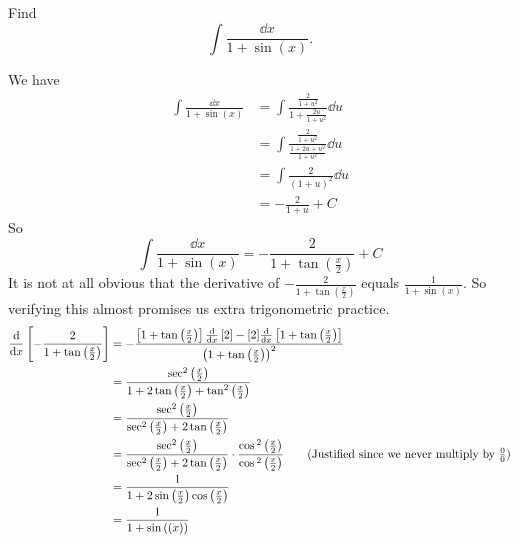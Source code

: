\begin{exercise}
    Find 
    \[ \int \frac{\dd{x}}{1 + \sin{ \left( x \right) }} .\]
\end{exercise}
\begin{solution}
We have 
\begin{align*}
    \int \frac{\dd{x}}{1 + \sin{ \left( x \right) }} &= \int \frac{ \frac{2}{1+ u^{2}}}{1 + \frac{2u}{1+u^{2}}} \dd{u} \\
    &= \int \frac{ \frac{2}{1+u^{2}}}{ \frac{1 + 2u + u^{2}}{1 + u^{2}}} \dd{u} \\
    &= \int \frac{2}{ \left( 1+u  \right)^{2}} \dd{u} \\
    &= - \frac{2}{1+u} + C
\end{align*}
So  \[ \boxed{\int \frac{\dd{x}}{1 + \sin{ \left( x \right) }}  = - \frac{2}{1 + \tan{ \left( \frac{x}{2} \right) }} +C} \]
It is not at all obvious that the derivative of \( - \frac{2}{1 + \tan{ \left( \frac{x}{2} \right) }} \) equals \( \frac{1}{1 + \sin{ \left( x \right) }} \). So verifying this almost promises us extra trigonometric practice. 
\begin{align*}
    \dv{x} \left[  - \frac{2}{1 + \tan{ \left( \frac{x}{2} \right) }}  \right] &= - \frac{  \left[ 1 + \tan{ \left( \frac{x}{2} \right) } \right] \dv{x}\left[ 2 \right] - [2] \dv{x} \left[ 1 + \tan{ \left( \frac{x}{2} \right) } \right]  }{ \left( 1 + \tan{ \left( \frac{x}{2} \right) } \right)^{2}} \\ 
    &= \frac{ \sec^{2}{ \left( \frac{x}{2} \right) }}{1 + 2 \tan{ \left( \frac{x}{2} \right) } + \tan^{2}{ \left( \frac{x}{2} \right) }} \\
    &= \frac{\sec^{2}{ \left( \frac{x}{2} \right) }}{\sec^{2}{ \left( \frac{x}{2} \right) } + 2 \tan{ \left( \frac{x}{2} \right) }} \\
     &= \frac{\sec^{2}{ \left( \frac{x}{2} \right) }}{\sec^{2}{ \left( \frac{x}{2} \right) } + 2 \tan{ \left( \frac{x}{2} \right) }} \cdot \frac{ \cos{^{2} \left( \frac{x}{2} \right) }}{\cos{^{2} \left( \frac{x}{2} \right) }} \tag{Justified since we never multiply by $\frac{0}{0}$} \\
     &= \frac{1}{1 + 2 \sin{ \left( \frac{x}{2} \right) } \cos{ \left( \frac{x}{2} \right) }} \\
     &= \frac{1}{1+ \sin{ \left( (x) \right) }}
\end{align*}

\end{solution}
